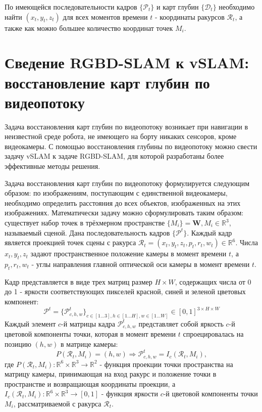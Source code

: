 \documentclass{mipt-thesis-ms}
\begin{document}
	По имеющейся последовательности кадров $\{\mathcal{P}_t\}$ и карт глубин $\{\mathcal{D}_t\}$ необходимо найти $(x_t, y_t, z_t)$ для всех моментов времени $t$ - координаты ракурсов $\mathcal{R}_t$, а также как можно большее количество координат точек $M_i$.
	
	\section{Сведение RGBD-SLAM к vSLAM: восстановление карт глубин по видеопотоку}
	
	Задача восстановления карт глубин по видеопотоку возникает при навигации в неизвестной среде робота, не имеющего на борту никаких сенсоров, кроме видеокамеры. С помощью восстановления глубины по видеопотоку можно свести задачу vSLAM к задаче RGBD-SLAM, для которой разработаны более эффективные методы решения.
	
	Задача восстановления карт глубин по видеопотоку формулируется следующим образом: по изображениям, поступающим с единственной видеокамеры, необходимо определить расстояния до всех объектов, изображенных на этих изображениях. Математически задачу можно сформулировать таким образом: существует набор точек в трёхмерном пространстве $\{M_i \} = \textbf{W}, M_i \in \mathbb{R}^3$, называемый сценой. Дана последовательность кадров $\{\mathcal{P}^t\}$. Каждый кадр является проекцией точек сцены с ракурса $\mathcal{R}_t = (x_t, y_t, z_t, p_t, r_t, w_t) \in \mathbb{R}^6$. Числа $x_t, y_t, z_t$ задают пространственное положение камеры в момент времени $t$, а $p_t, r_t, w_t$ - углы направления главной оптической оси камеры в момент времени $t$.
	
	Кадр представляется в виде трех матриц размер $H \times W$, содержащих числа от 0 до 1 - яркости соответствующих пикселей красной, синей и зеленой цветовых компонент:
	$$\mathcal{P}^t = \{\mathcal{P}^t_{c,h,w}\}_{c \in [1 \dots 3], h \in [1 \dots H], w \in [1 \dots W]} \in [0, 1]^{3 \times H \times W}$$
	Каждый элемент $c$-й матрицы кадра $\mathcal{P}^t_{c,h,w}$ представляет собой яркость $c$-й цветовой компоненты точки, которая в момент времени $t$ спроецировалась на позицию $(h, w)$ в матрице камеры:
	$$P(\mathcal{R}_t, M_i) = (h, w) \Rightarrow \mathcal{P}^t_{c,h,w} = I_c(\mathcal{R}_t, M_i),$$
	где $P(\mathcal{R}_t, M_i): \mathbb{R}^6 \times \mathbb{R}^3 \rightarrow \mathbb{R}^2$ - функция проекции точки пространства на матрицу камеры, принимающая на вход ракурс и положение точки в пространстве и возвращающая координаты проекции, а $I_c (\mathcal{R}_t, M_i): \mathbb{R}^6 \times \mathbb{R}^3 \rightarrow [0, 1]$ - функция яркости $c$-й цветовой компоненты точки $M_i$, рассматриваемой с ракурса $\mathcal{R}_t$.
	
\end{document}
